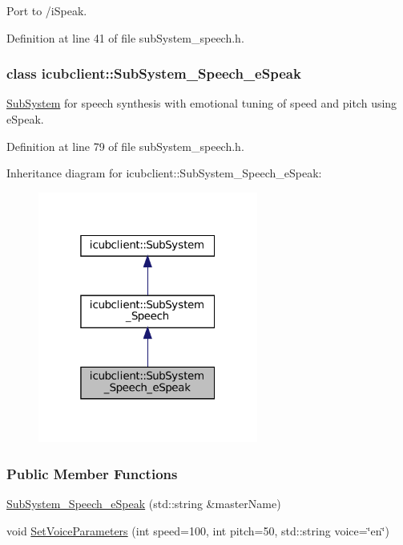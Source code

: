 Port to /i\+Speak. 



Definition at line 41 of file sub\+System\+\_\+speech.\+h.

\label{classicubclient_1_1SubSystem__Speech__eSpeak}
\subsubsection{class icubclient\+:\+:Sub\+System\+\_\+\+Speech\+\_\+e\+Speak}
\hyperlink{group__icubclient__subsystems_classicubclient_1_1SubSystem}{Sub\+System} for speech synthesis with emotional tuning of speed and pitch using e\+Speak. 

Definition at line 79 of file sub\+System\+\_\+speech.\+h.



Inheritance diagram for icubclient\+:\+:Sub\+System\+\_\+\+Speech\+\_\+e\+Speak\+:
\nopagebreak
\begin{figure}[H]
\begin{center}
\leavevmode
\includegraphics[width=205pt]{classicubclient_1_1SubSystem__Speech__eSpeak__inherit__graph}
\end{center}
\end{figure}
\subsubsection*{Public Member Functions}
\begin{DoxyCompactItemize}
\item 
\hyperlink{group__icubclient__subsystems_a09caab114b55db370a0e5d9add29d0c1}{Sub\+System\+\_\+\+Speech\+\_\+e\+Speak} (std\+::string \&master\+Name)
\item 
void \hyperlink{group__icubclient__subsystems_ac80be3015aba1e2248f896ac388e6ff6}{Set\+Voice\+Parameters} (int speed=100, int pitch=50, std\+::string voice=\char`\"{}en\char`\"{})
\end{DoxyCompactItemize}
